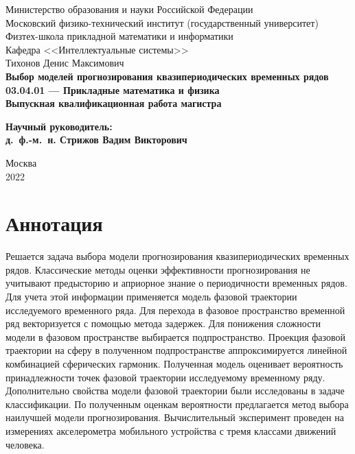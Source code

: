 \documentclass[article,14pt,subf,href,colorlinks=true
]{disser}
\begin{document}
\thispagestyle{empty}
\begin{center}
    \sc\small
        Министерство образования и науки Российской Федерации\\
        Московский физико-технический институт
        {\rm(государственный университет)}\\
        Физтех-школа прикладной математики и информатики\\
        Кафедра <<Интеллектуальные системы>>\\[20mm]
    \rm\large
        Тихонов Денис Максимович\\[10mm]
    \bf\Large
		Выбор моделей прогнозирования квазипериодических временных рядов\\[10mm]
    \rm\normalsize
        03.04.01 --- Прикладные математика и физика\\[10mm]
    \sc
        Выпускная квалификационная работа магистра\\[10mm]
\end{center}
\hfill\parbox{90mm}{
    \begin{flushleft}
    \bf
        Научный руководитель:\\
    \rm
        д.~ф.-м.~н. Стрижов Вадим Викторович\\[5.5cm]
    \end{flushleft}
}
\begin{center}
    Москва\\
    2022
\end{center}


{}

\tableofcontents

\section*{\centering Аннотация}
Решается задача выбора модели прогнозирования квазипериодических временных рядов.
Классические методы оценки эффективности прогнозирования не учитывают предысторию и априорное знание о периодичности временных рядов.
Для учета этой информации применяется модель фазовой траектории исследуемого временного ряда.
Для перехода в фазовое пространство временной ряд векторизуется с помощью метода задержек.
Для понижения сложности модели в фазовом пространстве выбирается подпространство.
Проекция фазовой траектории на сферу в полученном подпространстве аппроксимируется линейной комбинацией сферических гармоник.
Полученная модель оценивает вероятность принадлежности точек фазовой траектории исследуемому временному ряду.
Дополнительно свойства модели фазовой траектории были исследованы в задаче классификации.
По полученным оценкам вероятности предлагается метод выбора наилучшей модели прогнозирования.
Вычислительный эксперимент проведен на измерениях акселерометра мобильного устройства с тремя классами движений человека.
\end{document}
